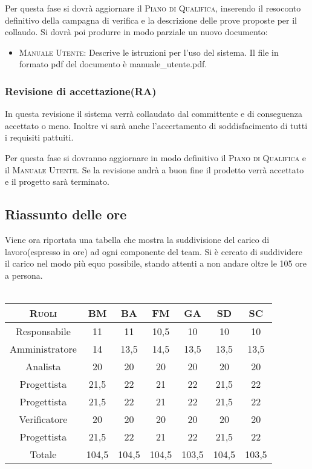 \documentclass[11pt,a4paper]{article}
\begin{document}
Per questa fase si dovrà aggiornare il \textsc{Piano di Qualifica}, inserendo il resoconto definitivo della campagna di verifica e la descrizione delle prove proposte per il collaudo. Si dovrà poi produrre in modo parziale un nuovo documento:
\begin{itemize}
\item \textsc{Manuale Utente}: Descrive le istruzioni per l'uso del sistema. Il file in formato pdf del documento è manuale\_utente.pdf.
\end{itemize}
\subsubsection{Revisione di accettazione(RA)}
In questa revisione il sistema verrà collaudato dal committente e di conseguenza accettato o meno. 
Inoltre vi sarà anche l'accertamento di soddisfacimento di tutti i requisiti pattuiti.

Per questa fase si dovranno aggiornare in modo definitivo il \textsc{Piano di Qualifica} e il \textsc{Manuale Utente}.
Se la revisione andrà a buon fine il prodetto verrà accettato e il progetto sarà terminato.
\subsection{Riassunto delle ore}
Viene ora riportata una tabella che mostra la suddivisione del carico di lavoro(espresso in ore) ad ogni componente del team.
Si è cercato di suddividere il carico nel modo più equo possibile, stando attenti a non andare oltre le 105 ore a persona.
\\\\
\begin{tabular}{|c|c|c|c|c|c|c|}
\hline
\textsc{Ruoli} & \textsc{BM} & \textsc{BA} & \textsc{FM} & \textsc{GA} & \textsc{SD} & \textsc{SC} \\ \hline \hline
Responsabile & 11 & 11 & 10,5 & 10 & 10 & 10 \\ \hline
Amministratore & 14 & 13,5 & 14,5 & 13,5 & 13,5 & 13,5 \\ \hline
Analista & 20 & 20 & 20 & 20 & 20 & 20 \\ \hline
Progettista & 21,5 & 22 & 21 & 22 & 21,5 & 22 \\ \hline
Progettista & 21,5 & 22 & 21 & 22 & 21,5 & 22 \\ \hline
Verificatore & 20 & 20 & 20 & 20 & 20 & 20 \\ \hline
Progettista & 21,5 & 22 & 21 & 22 & 21,5 & 22 \\ \hline
Totale & 104,5 & 104,5 & 104,5 & 103,5 & 104,5 & 103,5 \\ \hline
\end{tabular}
\end{document}

